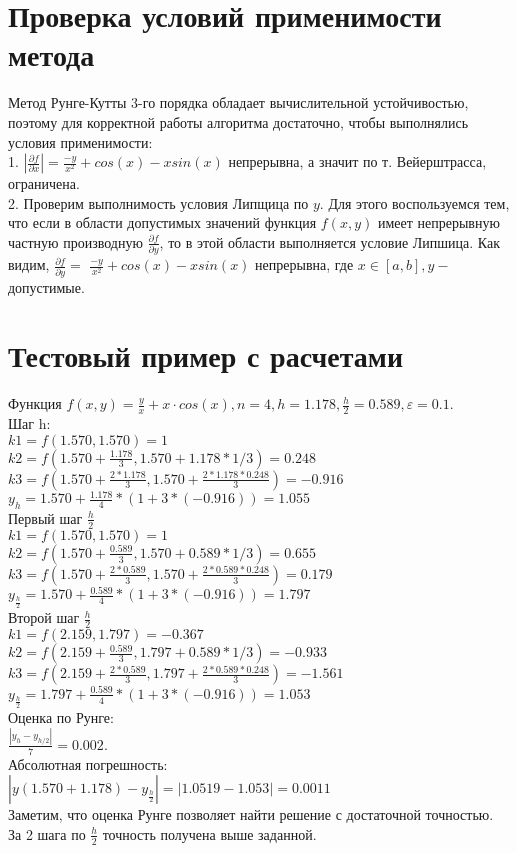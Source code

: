 \documentclass[12pt]{article}
\begin{document}
\section{Проверка условий применимости метода}
Метод Рунге-Кутты 3-го порядка обладает вычислительной устойчивостью, поэтому для корректной работы алгоритма достаточно, чтобы выполнялись условия применимости:\\
1. $\left|\frac{\partial f}{\partial x}\right|= \frac{-y}{x^2} + cos(x) - x sin(x)$ непрерывна, а значит по т. Вейерштрасса, ограничена.\\
2. Проверим выполнимость условия Липщица по $y$. Для этого воспользуемся тем, что если в области допустимых значений функция $f(x, y)$ имеет непрерывную частную производную $\frac{\partial f}{\partial y}$, то в этой области выполняется условие Липшица. Как видим, $\frac{\partial f}{\partial y}=$ $\frac{-y}{x^2} + cos(x) - x sin(x)$ непрерывна, где $x \in[a, b], y-$ допустимые.\\
\section{Тестовый пример с расчетами}
Функция $f(x,y) = \frac{y}{x} + x\cdot cos(x), n = 4, h = 1.178, \frac{h}{2} = 0.589, \varepsilon = 0.1. $\\
Шаг h:\\
$k1 = f(1.570, 1.570) = 1 $\\
$k2 = f(1.570 + \frac{1.178}{3}, 1.570 + 1.178 * 1 / 3 ) = 0.248$\\
$k3 = f(1.570 + \frac{2 * 1.178}{3}, 1.570 + \frac{2* 1.178 * 0.248}{3}) = -0.916$\\
$y_{h} = 1.570 + \frac{1.178}{4}* (1 + 3* (-0.916)) = 1.055$\\
Первый шаг $\frac{h}{2}$\\
$k1 = f(1.570, 1.570) = 1 $\\
$k2 = f(1.570 + \frac{0.589}{3}, 1.570 + 0.589 * 1 / 3 ) = 0.655$\\
$k3 = f(1.570 + \frac{2 * 0.589}{3}, 1.570 + \frac{2* 0.589 * 0.248}{3}) = 0.179$\\
$y_{\frac{h}{2}} = 1.570 + \frac{0.589}{4}* (1 + 3* (-0.916)) = 1.797$\\
Второй шаг $\frac{h}{2}$\\
$k1 = f(2.159, 1.797) = -0.367 $\\
$k2 = f(2.159 + \frac{0.589}{3}, 1.797 + 0.589 * 1 / 3 ) = -0.933$\\
$k3 = f(2.159 + \frac{2 * 0.589}{3}, 1.797 + \frac{2* 0.589 * 0.248}{3}) = -1.561$\\
$y_{\frac{h}{2}} = 1.797 + \frac{0.589}{4}* (1 + 3* (-0.916)) = 1.053$\\
Оценка по Рунге: \\
$\frac{|y_h-y_{h/2}|}{7} = 0.002$.\\
Абсолютная погрешность:\\
$|y(1.570 + 1.178) - y_{\frac{h}{2}}| = |1.0519 - 1.053| = 0.0011$\\
Заметим, что оценка Рунге позволяет найти решение с достаточной точностью.\\
За 2 шага по $\frac{h}{2}$ точность получена выше заданной.
\end{document}
